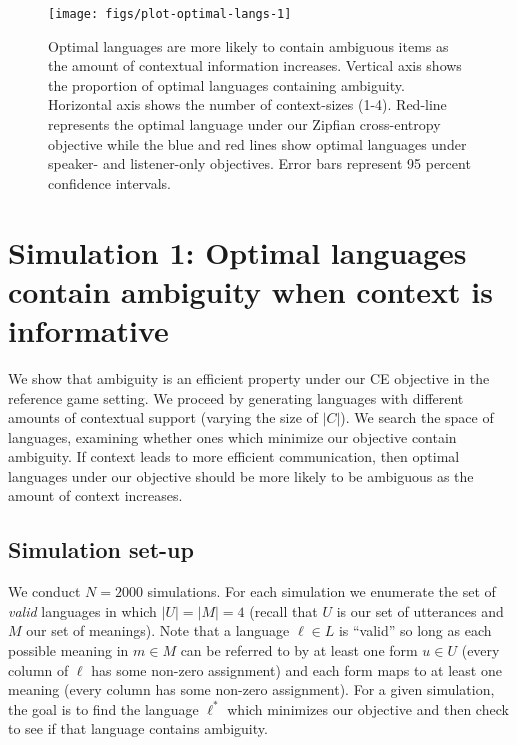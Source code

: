 \documentclass[10pt, letterpaper]{article}
\newenvironment{CodeChunk}{}{}
\begin{document}
\begin{CodeChunk}
\begin{figure*}[h]

{\centering \texttt{[image: figs/plot-optimal-langs-1]} 

}

\caption[Optimal languages are more likely to contain ambiguous items as the amount of contextual information increases]{Optimal languages are more likely to contain ambiguous items as the amount of contextual information increases. Vertical axis shows the proportion of optimal languages containing ambiguity. Horizontal axis shows the number of context-sizes (1-4). Red-line represents the optimal language under our Zipfian cross-entropy objective while the blue and red lines show optimal languages under speaker- and listener-only objectives. Error bars represent 95 percent confidence intervals.}\label{fig:plot-optimal-langs}
\end{figure*}
\end{CodeChunk}

\section{Simulation 1: Optimal languages contain ambiguity when context
is
informative}\label{simulation-1-optimal-languages-contain-ambiguity-when-context-is-informative}

We show that ambiguity is an efficient property under our CE objective
in the reference game setting. We proceed by generating languages with
different amounts of contextual support (varying the size of \(|C|\)).
We search the space of languages, examining whether ones which minimize
our objective contain ambiguity. If context leads to more efficient
communication, then optimal languages under our objective should be more
likely to be ambiguous as the amount of context increases.\par

\subsection{Simulation set-up}\label{simulation-set-up}

We conduct \(N=2000\) simulations. For each simulation we enumerate the
set of \emph{valid} languages in which \(|U|=|M|=4\) (recall that \(U\)
is our set of utterances and \(M\) our set of meanings). Note that a
language \(\ell \in L\) is ``valid'' so long as each possible meaning in
\(m \in M\) can be referred to by at least one form \(u \in U\) (every
column of \(\ell\) has some non-zero assignment) and each form maps to
at least one meaning (every column has some non-zero assignment). For a
given simulation, the goal is to find the language \(\ell^*\) which
minimizes our objective and then check to see if that language contains
ambiguity.\par
\end{document}
